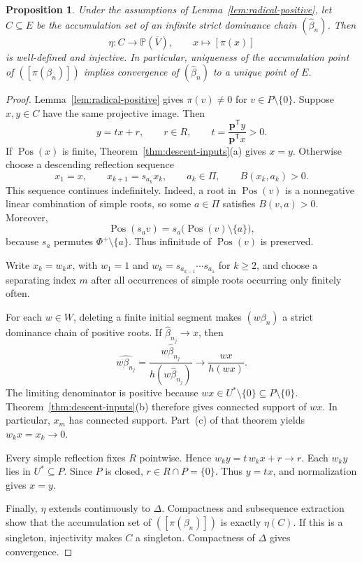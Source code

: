 \documentclass[11pt,reqno]{amsart}
\theoremstyle{plain}
\newtheorem{proposition}[theorem]{Proposition}
\theoremstyle{definition}
\theoremstyle{remark}
\numberwithin{equation}{section}
\DeclareMathOperator{\Pos}{Pos}
\begin{document}
\begin{proposition}\label{prop:quotient-lifting}
Under the assumptions of Lemma~\ref{lem:radical-positive}, let $C\subseteq E$ be the accumulation set of an infinite strict dominance chain $(\widehat{\beta}_n)$. Then
\[
\eta:C\longrightarrow\mathbb P(\overline V),\qquad x\longmapsto[\pi(x)]
\]
is well-defined and injective. In particular, uniqueness of the accumulation point of $([\pi(\beta_n)])$ implies convergence of $(\widehat{\beta}_n)$ to a unique point of $E$.
\end{proposition}
\begin{proof}
Lemma~\ref{lem:radical-positive} gives $\pi(v)\neq0$ for $v\in P\setminus\{0\}$. Suppose $x,y\in C$ have the same projective image. Then
\[
y=tx+r,\qquad r\in R,\qquad t=\frac{\mathbf p^{\mathsf T}y}{\mathbf p^{\mathsf T}x}>0.
\]
If $\Pos(x)$ is finite, Theorem~\ref{thm:descent-inputs}(a) gives $x=y$. Otherwise choose a descending reflection sequence
\[
x_1=x,\qquad x_{k+1}=s_{a_k}x_k,\qquad a_k\in\Pi,\qquad B(x_k,a_k)>0.
\]
This sequence continues indefinitely. Indeed, a root in $\Pos(v)$ is a nonnegative linear combination of simple roots, so some $a\in\Pi$ satisfies $B(v,a)>0$. Moreover,
\[
\Pos(s_av)=s_a\bigl(\Pos(v)\setminus\{a\}\bigr),
\]
because $s_a$ permutes $\Phi^+\setminus\{a\}$. Thus infinitude of $\Pos(v)$ is preserved.

Write $x_k=w_kx$, with $w_1=1$ and $w_k=s_{a_{k-1}}\cdots s_{a_1}$ for $k\geq2$, and choose a separating index $m$ after all occurrences of simple roots occurring only finitely often.

For each $w\in W$, deleting a finite initial segment makes $(w\beta_n)$ a strict dominance chain of positive roots. If $\widehat{\beta}_{n_j}\to x$, then
\[
\widehat{w\beta_{n_j}}=
\frac{w\widehat{\beta}_{n_j}}{h(w\widehat{\beta}_{n_j})}
\longrightarrow\frac{wx}{h(wx)}.
\]
The limiting denominator is positive because $wx\in U^*\setminus\{0\}\subseteq P\setminus\{0\}$. Theorem~\ref{thm:descent-inputs}(b) therefore gives connected support of $wx$. In particular, $x_m$ has connected support. Part~(c) of that theorem yields $w_kx=x_k\to0$.

Every simple reflection fixes $R$ pointwise. Hence $w_ky=t\,w_kx+r\to r$. Each $w_ky$ lies in $U^*\subseteq P$. Since $P$ is closed, $r\in R\cap P=\{0\}$. Thus $y=tx$, and normalization gives $x=y$.

Finally, $\eta$ extends continuously to $\Delta$. Compactness and subsequence extraction show that the accumulation set of $([\pi(\beta_n)])$ is exactly $\eta(C)$. If this is a singleton, injectivity makes $C$ a singleton. Compactness of $\Delta$ gives convergence.
\end{proof}
\end{document}
